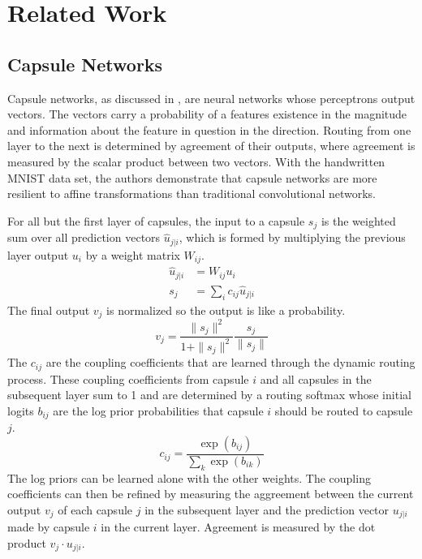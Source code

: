 \documentclass{IEEEtran}
\begin{document}
\section{Related Work}
\subsection{Capsule Networks}
Capsule networks, as discussed in \cite{sabour2017dynamic}, are neural networks
whose perceptrons output vectors. The vectors carry a probability of a features
existence in the magnitude and information about the feature in question in the
direction. Routing from one layer to the next is determined by agreement of
their outputs, where agreement is measured by the scalar product between two
vectors. With the handwritten MNIST data set, the authors demonstrate that
capsule networks are more resilient to affine transformations than traditional
convolutional networks.

For all but the first layer of capsules, the input to a capsule \(s_{j}\) is the
weighted sum over all prediction vectors \(\hat{u}_{j|i}\), which is formed by
multiplying the previous layer output \(u_{i}\) by a weight matrix \(W_{ij}\).
\begin{align*}
    \hat{u}_{j|i} & = W_{i j} u_{i} \\
    s_{j} & = \sum_{i} c_{i j} \hat{u}_{j|i}
\end{align*}
The final output \(v_{j}\) is normalized so the output is like a probability.
\[v_{j} = \frac{\|s_{j}\|^{2}}{1 + \|s_{j}\|^{2}}\frac{s_{j}}{\|s_{j}\|}\]
The \(c_{ij}\) are the coupling coefficients that are learned through the
dynamic routing process. These coupling coefficients from capsule \(i\) and all
capsules in the subsequent layer sum to 1 and are determined by a routing
softmax whose initial logits \(b_{ij}\) are the log prior probabilities that
capsule \(i\) should be routed to capsule \(j\).
\[c_{ij} = \frac{\exp\left(b_{ij}\right)}{\sum_{k} \exp\left(b_{ik}\right)}\]
The log priors can be learned alone with the other weights. The coupling
coefficients can then be refined by measuring the aggreement between the current
output \(v_{j}\) of each capsule \(j\) in the subsequent layer and the
prediction vector \(u_{j|i}\) made by capsule \(i\) in the current layer.
Agreement is measured by the dot product \(v_{j}\cdot u_{j|i}\).
\end{document}
